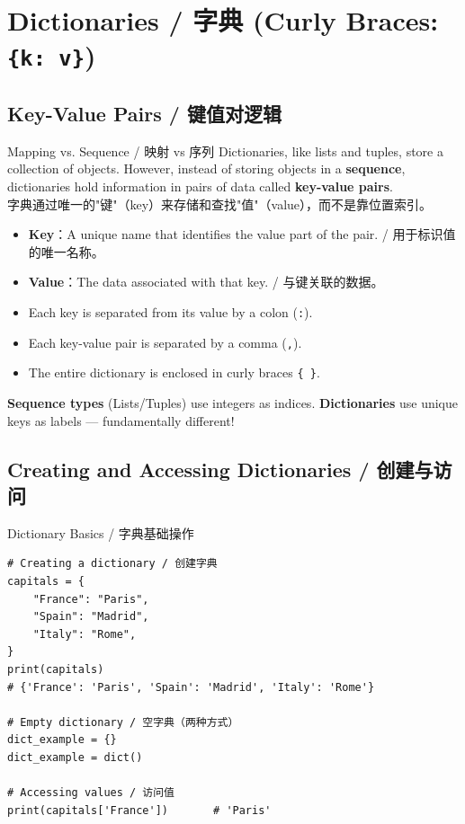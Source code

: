 \documentclass[11pt,a4paper]{report}
\let\oldtexttt\texttt
\renewcommand{\texttt}[1]{\textcolor{mainblue}{\oldtexttt{#1}}}
\begin{document}
\section{Dictionaries / 字典 (Curly Braces: \texttt{\{k: v\}})}

\subsection{Key-Value Pairs / 键值对逻辑}

\begin{concept}{Mapping vs. Sequence / 映射 vs 序列}
    Dictionaries, like lists and tuples, store a collection of objects. However, instead of storing objects in a \textbf{sequence}, dictionaries hold information in pairs of data called \textbf{key-value pairs}. \\
    字典通过唯一的"键"（key）来存储和查找"值"（value），而不是靠位置索引。

    \begin{itemize}[itemsep=0.3em]
        \item \textbf{Key}：A unique name that identifies the value part of the pair. / 用于标识值的唯一名称。
        \item \textbf{Value}：The data associated with that key. / 与键关联的数据。
        \item Each key is separated from its value by a colon (\texttt{:}).
        \item Each key-value pair is separated by a comma (\texttt{,}).
        \item The entire dictionary is enclosed in curly braces \texttt{\{ \}}.
    \end{itemize}

    \textbf{Sequence types} (Lists/Tuples) use integers as indices. \textbf{Dictionaries} use unique keys as labels — fundamentally different!
\end{concept}

\subsection{Creating and Accessing Dictionaries / 创建与访问}

\begin{examplebox}{Dictionary Basics / 字典基础操作}
\begin{lstlisting}
# Creating a dictionary / 创建字典
capitals = {
    "France": "Paris",
    "Spain": "Madrid",
    "Italy": "Rome",
}
print(capitals)
# {'France': 'Paris', 'Spain': 'Madrid', 'Italy': 'Rome'}

# Empty dictionary / 空字典（两种方式）
dict_example = {}
dict_example = dict()

# Accessing values / 访问值
print(capitals['France'])       # 'Paris'
\end{lstlisting}
\end{examplebox}
\end{document}
